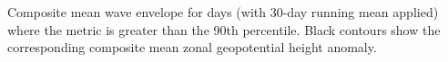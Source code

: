 \label{fig:envelope_climatology}
Composite mean wave envelope for days (with 30-day running mean applied) where the metric is greater than the 90th percentile. Black contours show the corresponding composite mean zonal geopotential height anomaly.  